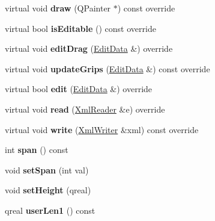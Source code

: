 \begin{DoxyCompactItemize}
virtual void {\bfseries draw} (Q\+Painter $\ast$) const override
\item 
\mbox{\label{class_ms_1_1_arpeggio_a9a6ad765c60e3dea5e9ce2ad9a46faed}} 
virtual bool {\bfseries is\+Editable} () const override
\item 
\mbox{\label{class_ms_1_1_arpeggio_a15b9e6955af53a4612641b8a7be864c4}} 
virtual void {\bfseries edit\+Drag} (\hyperlink{class_ms_1_1_edit_data}{Edit\+Data} \&) override
\item 
\mbox{\label{class_ms_1_1_arpeggio_a89b29f89d578e8679f139fc54bce92f1}} 
virtual void {\bfseries update\+Grips} (\hyperlink{class_ms_1_1_edit_data}{Edit\+Data} \&) const override
\item 
\mbox{\label{class_ms_1_1_arpeggio_a211045d330047bd4dc0fbc42a2a386b0}} 
virtual bool {\bfseries edit} (\hyperlink{class_ms_1_1_edit_data}{Edit\+Data} \&) override
\item 
\mbox{\label{class_ms_1_1_arpeggio_a207a3e62783e69c3ccefc853ccda508b}} 
virtual void {\bfseries read} (\hyperlink{class_ms_1_1_xml_reader}{Xml\+Reader} \&e) override
\item 
\mbox{\label{class_ms_1_1_arpeggio_a8f1a747193a967bfae49d9e33e969c24}} 
virtual void {\bfseries write} (\hyperlink{class_ms_1_1_xml_writer}{Xml\+Writer} \&xml) const override
\item 
\mbox{\label{class_ms_1_1_arpeggio_a2798d0ef2c067aefb5ec1569477c80a7}} 
int {\bfseries span} () const
\item 
\mbox{\label{class_ms_1_1_arpeggio_a4c9a310128913b3e13fa00da5d39bae8}} 
void {\bfseries set\+Span} (int val)
\item 
\mbox{\label{class_ms_1_1_arpeggio_ab548e1fae74df75b4ccbb98830149cd3}} 
void {\bfseries set\+Height} (qreal)
\item 
\mbox{\label{class_ms_1_1_arpeggio_a1b97d4608c70f23c4dfcb3e79eac21d0}} 
qreal {\bfseries user\+Len1} () const

\end{DoxyCompactItemize}
